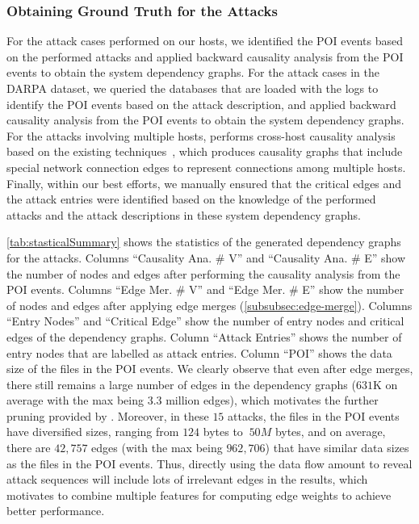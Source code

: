 \subsubsection{Obtaining Ground Truth for the Attacks}
For the attack cases performed on our hosts, we identified the POI events based on the performed attacks and applied backward causality analysis from the POI events to obtain the system dependency graphs.
For the attack cases in the DARPA dataset, we queried the databases that are loaded with the logs to identify the POI events based on the attack description, and applied backward causality analysis from the POI events to obtain the system dependency graphs.
For the attacks involving multiple hosts, \tool performs cross-host causality analysis based on the existing techniques~\cite{liu2018priotracker,backtracking2},
which produces causality graphs that include special network connection edges to represent connections among multiple hosts.
Finally, within our best efforts, we manually ensured that the critical edges and the attack entries were identified based on the knowledge of the performed attacks and the attack descriptions in these system dependency graphs.


\cref{tab:stasticalSummary} shows the statistics of the generated dependency graphs for the attacks. 
Columns ``Causality Ana. \# V'' and ``Causality Ana. \# E'' show the number of nodes and edges after performing the causality analysis from the POI events.
Columns ``Edge Mer. \# V'' and ``Edge Mer. \# E'' show the number of nodes and edges after applying edge merges (\cref{subsubsec:edge-merge}).
Columns ``Entry Nodes'' and  ``Critical Edge'' show the number of entry nodes and critical edges of the dependency graphs. 
Column ``Attack Entries'' shows the number of entry nodes that are labelled as attack entries.
Column ``POI'' shows the data size of the files in the POI events.
%
We clearly observe that even after edge merges, there still remains a large number of edges in the dependency graphs ($631$K on average with the max being $3.3$ million edges), which motivates the further pruning provided by \tool.
Moreover, in these $15$ attacks, the files in the POI events have diversified sizes, ranging from $124$ bytes to $~50M$ bytes, and on average, there are $42,757$ edges (with the max being $962,706$) that have similar data sizes as the files in the POI events.
Thus, directly using the data flow amount to reveal attack sequences will include lots of irrelevant edges in the results, which motivates \tool to combine multiple features for computing edge weights to achieve better performance.


